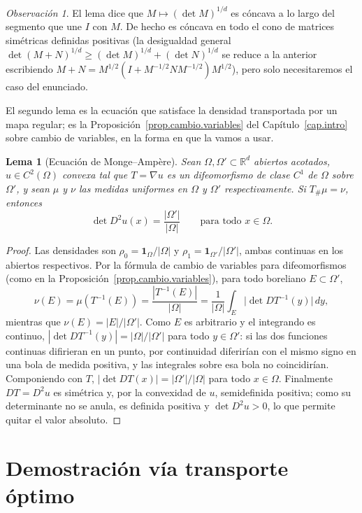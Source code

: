 \documentclass[12pt, a4paper]{amsbook}
\newcommand{\R}{{\mathbb R}}
\newtheorem{lema}[teo]{Lema}
\theoremstyle{remark}
\newtheorem{obs}[teo]{Observación}
\theoremstyle{definition}
\numberwithin{section}{chapter}
\numberwithin{subsection}{section}
\numberwithin{equation}{section}
\numberwithin{figure}{chapter}
\begin{document}
\begin{obs}
El lema dice que $M\mapsto(\det M)^{1/d}$ es cóncava a lo largo del segmento
que une $I$ con $M$. De hecho es cóncava en todo el cono de matrices
simétricas definidas positivas (la desigualdad general
$\det(M+N)^{1/d}\ge(\det M)^{1/d}+(\det N)^{1/d}$ se reduce a la anterior
escribiendo $M+N=M^{1/2}(I+M^{-1/2}NM^{-1/2})M^{1/2}$), pero solo
necesitaremos el caso del enunciado.
\end{obs}

El segundo lema es la ecuación que satisface la densidad transportada por un
mapa regular; es la Proposición~\ref{prop.cambio.variables} del Capítulo~\ref{cap.intro} sobre cambio
de variables, en la forma en que la vamos a usar.

\begin{lema}[Ecuación de Monge--Ampère]\label{lema.MA}
Sean $\Omega,\Omega'\subset\R^d$ abiertos acotados, $u\in C^2(\Omega)$ convexa
tal que $T=\nabla u$ es un difeomorfismo de clase $C^1$ de $\Omega$ sobre
$\Omega'$, y sean $\mu$ y $\nu$ las medidas uniformes en $\Omega$ y $\Omega'$
respectivamente. Si $T_\#\mu=\nu$, entonces
\[
\det D^2u(x)=\frac{|\Omega'|}{|\Omega|}
\qquad\text{para todo }x\in\Omega.
\]
\end{lema}

\begin{proof}
Las densidades son $\rho_0=\mathbf 1_\Omega/|\Omega|$ y
$\rho_1=\mathbf 1_{\Omega'}/|\Omega'|$, ambas continuas en los abiertos
respectivos. Por la fórmula de cambio de variables para difeomorfismos
(como en la Proposición~\ref{prop.cambio.variables}), para todo boreliano $E\subset\Omega'$,
\[
\nu(E)=\mu(T^{-1}(E))=\frac{|T^{-1}(E)|}{|\Omega|}
=\frac1{|\Omega|}\int_E\bigl|\det DT^{-1}(y)\bigr|\,dy,
\]
mientras que $\nu(E)=|E|/|\Omega'|$. Como $E$ es arbitrario y el integrando es
continuo, $|\det DT^{-1}(y)|=|\Omega|/|\Omega'|$ para todo $y\in\Omega'$: si
las dos funciones continuas difirieran en un punto, por continuidad
diferirían con el mismo signo en una bola de medida positiva, y las
integrales sobre esa bola no coincidirían. Componiendo con $T$,
$|\det DT(x)|=|\Omega'|/|\Omega|$ para todo $x\in\Omega$.
Finalmente $DT=D^2u$ es simétrica y, por la convexidad de $u$, semidefinida
positiva; como su determinante no se anula, es definida positiva y
$\det D^2u>0$, lo que permite quitar el valor absoluto.
\end{proof}

\section{Demostración vía transporte óptimo}\label{sec.BM.demo}
\end{document}
